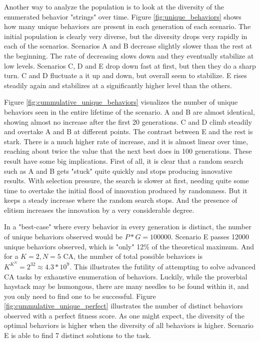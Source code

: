 Another way to analyze the population is to look at the diversity of the enumerated behavior "strings" over time.
Figure \ref{fig:unique_behaviors} shows how many unique behaviors are present in each generation of each scenario.
The initial population is clearly very diverse, but the diversity drops very rapidly in each of the scenarios.
Scenarios A and B decrease slightly slower than the rest at the beginning.
The rate of decreasing slows down and they eventually stabilize at low levels.
Scenarios C, D and E drop down fast at first, but then they do a sharp turn.
C and D fluctuate a it up and down, but overall seem to stabilize.
E rises steadily again and stabilizes at a significantly higher level than the others.

Figure \ref{fig:cummulative_unique_behaviors} visualizes the number of unique behaviors seen in the entire lifetime of the scenario.
A and B are almost identical, showing almost no increase after the first 20 generations.
C and D climb steadily and overtake A and B at different points.
The contrast between E and the rest is stark.
There is a much higher rate of increase, and it is almost linear over time, reaching about twice the value that the next best does in 100 generations.
These result have some big implications.
First of all, it is clear that a random search such as A and B gets "stuck" quite quickly and stops producing innovative results.
With selection pressure, the search is slower at first, needing quite some time to overtake the initial flood of innovation produced by randomness.
But it keeps a steady increase where the random search stops.
And the presence of elitism increases the innovation by a very considerable degree.

In a "best-case" where every behavior in every generation is distinct,
the number of unique behaviors observed would be $P * G = 100000$.
Scenario E passes 12000 unique behaviors observed, which is "only" 12\% of the theoretical maximum.
And for a $K=2, N=5$ CA, the number of total possible behaviors is $K^{K^N} = 2^{32} \approx 4.3 * 10^9$.
This illustrates the futility of attempting to solve advanced CA tasks by exhaustive enumeration of behaviors.
Luckily, while the proverbial haystack may be humongous,
there are many needles to be found within it, and you only need to find one to be successful.
Figure \ref{fig:cummulative_unique_perfect} illustrates the number of distinct behaviors observed with a perfect fitness score.
As one might expect, the diversity of the optimal behaviors is higher when the diversity of all behaviors is higher.
Scenario E is able to find 7 distinct solutions to the task.

